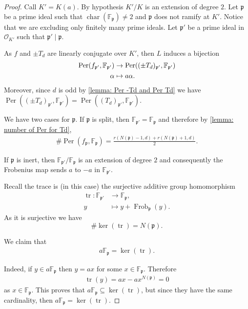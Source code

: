 \documentclass{amsart}
\def\FF{\mathbb F}
\DeclareMathOperator{\Per}{Per}
\DeclareMathOperator{\car}{char}
\DeclareMathOperator{\tr}{tr}
\DeclareMathOperator{\Frob}{Frob}
\theoremstyle{definition}
\begin{document}
\begin{proof}
Call $K' = K(a)$. By hypothesis $K'/K$ is an extension of degree $2$. Let $\mathfrak{p}$ be a prime ideal such that $\car(\FF_\mathfrak{p}) \neq 2$ and $\mathfrak{p}$ does not ramify at $K'$. Notice that we are excluding only finitely many prime ideals. Let $\mathfrak{p}'$ be a prime ideal in $\mathcal{O}_{K'}$ such that $\mathfrak{p}' \mid \mathfrak{p}$.

As $f$ and $\pm T_d$ are linearly conjugate over $K'$, then $L$ induces a bijection
\begin{align}
\label{equation: bijection Per f and Per Td d odd a not in K}
\Per(f_{\mathfrak{p}'}, \FF_{\mathfrak{p}'}) &\rightarrow  \Per((\pm T_d)_{\mathfrak{p}'}, \FF_{\mathfrak{p}'}) \\
\notag \alpha &\mapsto a \alpha.
\end{align}
Moreover, since $d$ is odd by \cref{lemma: Per -Td and Per Td} we have $\Per((\pm T_d)_{\mathfrak{p}'}, \FF_{\mathfrak{p}'}) = \Per((T_d)_{\mathfrak{p}'}, \FF_{\mathfrak{p}'})$.

We have two cases for $\mathfrak{p}$. If $\mathfrak{p}$ is split, then $\FF_{\mathfrak{p}'} = \FF_\mathfrak{p}$ and therefore by \cref{lemma: number of Per for Td},
\begin{align}
\# \Per(f_\mathfrak{p}, \FF_\mathfrak{p}) = \frac{r(N(\mathfrak{p})-1,d) + r(N(\mathfrak{p})+1,d)}{2}.
\label{equation: Per f in split case}
\end{align}

If $\mathfrak{p}$ is inert, then $\FF_{\mathfrak{p}'}/\FF_\mathfrak{p}$ is an extension of degree $2$ and consequently the Frobenius map sends $a$ to $-a$ in $\FF_\mathfrak{p'}$.

Recall the trace is (in this case) the surjective additive group homomorphism
\begin{align*}
\tr: \FF_{\mathfrak{p}'} &\rightarrow \FF_\mathfrak{p}, \\
y &\mapsto y + \Frob_\mathfrak{p}(y).
\end{align*}
As it is surjective we have $$\# \ker(\tr) = N(\mathfrak{p}).$$

We claim that
\begin{align*}
a \FF_\mathfrak{p} = \ker(\tr).
\end{align*}

Indeed, if $y\in a \FF_\mathfrak{p}$ then $y = ax$ for some $x \in \FF_\mathfrak{p}$. Therefore 
\begin{align*}
\tr(y) = ax -ax^{N(\mathfrak{p})} = 0
\end{align*}
as $x \in \FF_\mathfrak{p}$. This proves that $a\FF_\mathfrak{p} \subseteq \ker(\tr)$, but since they have the same cardinality, then $a\FF_\mathfrak{p} = \ker(\tr)$.


\end{proof}
\end{document}
